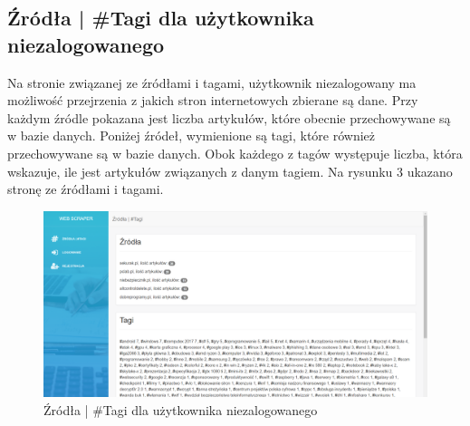 \documentclass[12pt, titlepage]{article}
\begin{document}
	\newpage
	\subsection{Źródła | \#Tagi dla użytkownika niezalogowanego}
	Na stronie związanej ze źródłami i tagami, użytkownik niezalogowany ma możliwość przejrzenia z jakich stron internetowych zbierane są dane. Przy każdym źródle pokazana jest liczba artykułów, które obecnie przechowywane są w bazie danych. Poniżej źródeł, wymienione są tagi, które również przechowywane są w bazie danych. Obok każdego z tagów występuje liczba, która wskazuje, ile jest artykułów związanych z danym tagiem. Na rysunku 3 ukazano stronę ze źródłami i tagami.
	\begin{figure}[H]
		\centering
		\includegraphics[scale=0.45]{obrazki/niezalogowanyZrodla.png}
		\caption{Źródła | \#Tagi dla użytkownika niezalogowanego}
		\label{fig:db_schema}
	\end{figure}
	
	\newpage
\end{document}
